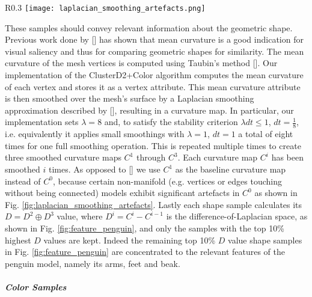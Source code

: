 \begin{wrapfigure}{R}{0.3\textwidth}
\texttt{[image: laplacian\_smoothing\_artefacts.png]}
\caption{$C^0$ (left) exhibits significant artefacts on a non-manifold mesh. $C^1$ (right) is a more sensible curvature map as baseline for the shown model.}
\label{fig:laplacian_smoothing_artefacts}
\end{wrapfigure}

These samples should convey relevant information about the geometric shape. Previous work done by [] has
shown that mean curvature is a good indication for visual saliency and thus for comparing geometric shapes for similarity. The mean curvature of the mesh vertices is computed using Taubin's method [].
Our implementation of the ClusterD2+Color algorithm computes the mean curvature of each vertex and stores it as a vertex attribute. This mean curvature attribute is then smoothed over the mesh's surface
by a Laplacian smoothing approximation described by [], resulting in a curvature map.
In particular, our implementation sets $\lambda = 8$ and, to satisfy the stability criterion $\lambda dt \leq 1$, $dt = \frac{1}{8}$, i.e. equivalently it applies small smoothings with $\lambda = 1$, $dt = 1$ a total of eight times for one
full smoothing operation. This is repeated multiple times to create three smoothed curvature maps $C^1$ through $C^3$. Each curvature map $C^i$ has been smoothed $i$ times. As opposed to [] we use
$C^1$ as the baseline curvature map instead of $C^0$, because certain non-manifold (e.g. vertices or edges touching without being connected) models exhibit significant artefacts in $C^0$ as shown in Fig. \ref{fig:laplacian_smoothing_artefacts}. Lastly each shape sample calculates its $D = D^2 \oplus D^3$ value, where $D^i = C^i - C^{i-1}$ is the difference-of-Laplacian space, as shown in Fig. \ref{fig:feature_penguin}, and only the samples with the top 10\% highest $D$ values are kept. Indeed the remaining top
10\% $D$ value shape samples in Fig. \ref{fig:feature_penguin} are concentrated to the relevant features of the penguin model, namely its arms, feet and beak.

\subparagraph{Color Samples}


